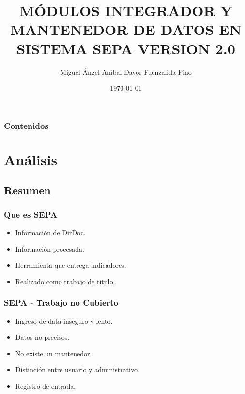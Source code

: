 \documentclass{beamer}
\title[SEPA 2.0]{MÓDULOS INTEGRADOR Y MANTENEDOR DE DATOS EN SISTEMA SEPA VERSION 2.0} %
\author{Miguel Ángel Aníbal Davor Fuenzalida Pino} %
\institute[UTEM] %
{
UNIVERSIDAD TECNOLÓGICA METROPOLITANA \\ %
\medskip
\textit{anibaldavor@gmail.com} %
}
\date{\today} %
\begin{document}
\begin{frame}
\titlepage %
\end{frame}

\begin{frame}
\frametitle{Contenidos} %
\tableofcontents %
\end{frame}


\section{Análisis}

\subsection{Resumen}

\begin{frame}
\frametitle{Que es SEPA}
\begin{itemize}
\item Información de DirDoc.
\item Información procesada.
\item Herramienta que entrega indicadores.
\item Realizado como trabajo de titulo.
\end{itemize}
\end{frame}


\begin{frame}
\frametitle{SEPA - Trabajo no Cubierto}
\begin{itemize}
\item Ingreso de data inseguro y lento.
\item Datos no precisos.
\item No existe un mantenedor.
\item Distinción entre usuario y administrativo.
\item Registro de entrada.
\end{itemize}
\end{frame}
\end{document}
